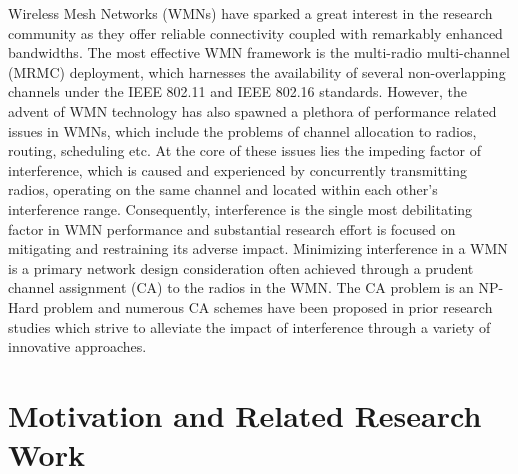 \documentclass[conference]{IEEEtran}
\begin{document}
Wireless Mesh Networks (WMNs) have sparked a great interest in the research community as they offer reliable connectivity coupled with remarkably enhanced bandwidths. The most effective WMN framework is the multi-radio multi-channel (MRMC) deployment, which harnesses the availability of several non-overlapping channels under the IEEE 802.11 and IEEE 802.16 standards. However, the advent of WMN technology has also spawned a plethora of performance related issues in WMNs, which include the problems of channel allocation to radios, routing, scheduling etc. At the core of these issues lies the impeding factor of interference, which is caused and experienced by concurrently transmitting radios, operating on the same channel and located within each other's interference range. 
Consequently, interference is the single most debilitating factor in WMN performance and substantial research effort is focused on mitigating and restraining its adverse impact. Minimizing interference in a WMN is a primary network design consideration often achieved through a prudent channel assignment (CA) to the radios in the WMN. The CA problem is an NP-Hard problem \cite{NPcomplete} and numerous CA schemes have been proposed in prior research studies \cite{Ding} which strive to alleviate the impact of interference through a variety of innovative approaches.
  
\section{Motivation and Related Research Work}
 
\end{document}
